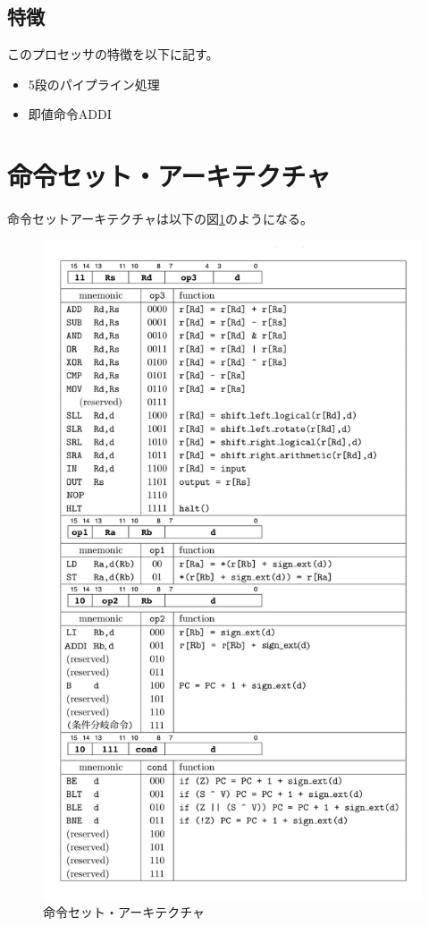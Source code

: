 \documentclass[a4j,titlepage]{jarticle}
\begin{document}
\subsection{特徴}
このプロセッサの特徴を以下に記す。
\begin{itemize}
\item 5段のパイプライン処理
\item 即値命令ADDI
\end{itemize}

\section{命令セット・アーキテクチャ}
命令セットアーキテクチャは以下の図\ref{instructionSet}のようになる。
\newpage

\begin{figure}[H]
    \begin{center}
    \includegraphics[scale = 0.34]{instructionSet.jpg}
    \end{center}
    \caption{命令セット・アーキテクチャ}
    \label{instructionSet}
\end{figure}
\end{document}
